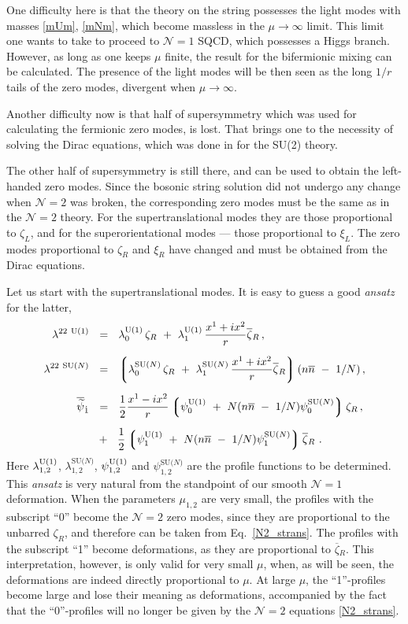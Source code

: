 \documentclass[12pt]{article}
\newcommand{\ntwo}{${\mathcal N}=2$ }
\newcommand{\none}{${\mathcal N}=1$ }
\newcommand{\wt}{\widetilde}
\newcommand{\ov}{\overline}
\newcommand{\lgr}{\left\lgroup}
\newcommand{\rgr}{\right\rgroup}
\newcommand{\bzr}{\ov{\zeta}{}_R}
\newcommand{\nbar}{\ov{n}}
\newcommand{\loU}{\lambda_0^{\rm U(1)}}
\newcommand{\llU}{\lambda_1^{\rm U(1)}}
\newcommand{\loN}{\lambda_0^\text{SU($N$)}}
\newcommand{\llN}{\lambda_1^\text{SU($N$)}}
\newcommand{\poU}{\psi_0^{\rm U(1)}}
\newcommand{\plU}{\psi_1^{\rm U(1)}}
\newcommand{\poN}{\psi_0^\text{SU($N$)}}
\newcommand{\plN}{\psi_1^\text{SU($N$)}}
\begin{document}
	One difficulty here is that the theory on the string possesses the light modes with masses \eqref{mUm}, \eqref{mNm},
	which become massless in the $ \mu \to \infty $ limit.
	This limit one wants to take to proceed to \none SQCD, which possesses a Higgs branch.
	However, as long as one keeps $ \mu $ finite, the result for the bifermionic mixing can be calculated.
	The presence of the light modes will be then seen as the long $ 1/r $ tails of the zero modes,
	divergent when $ \mu \to \infty $.

	Another difficulty now is that half of supersymmetry which was used for calculating the fermionic zero modes, is lost.
	That brings one to the necessity of solving the Dirac equations, which was done in \cite{SYhet} for the SU(2) theory.
	
	The other half of supersymmetry is still there, and can be used to obtain the left-handed zero modes. 
	Since the bosonic string solution did not undergo any change when \ntwo was broken, the corresponding zero modes
	must be the same as in the \ntwo theory.
	For the supertranslational modes they are those proportional to $ \zeta_L $, and for the superorientational
	modes --- those proportional to $ \xi_L $.
	The zero modes proportional to $ \zeta_R $ and $ \xi_R $ have changed and must be obtained from the Dirac equations. 

	Let us start with the supertranslational modes.
	It is easy to guess a good {\it ansatz} for the latter,
\begin{align}
%
\notag
	\lambda^{22\ \rm U(1)} & ~~=~~ \loU\, \zeta_R ~+~ \llU\, \frac{x^1 + i x^2}{r} \ov{\zeta}{}_R \,,
	\\[2mm]
%
\notag
	\lambda^{22\ \text{SU($N$)}} & ~~=~~ \lgr  \loN\, \zeta_R ~+~ \llN\, \frac{x^1 + i x^2}{r} \ov{\zeta}{}_R \rgr
					( n\nbar ~-~ 1/N )\,,
	\\[2mm]
%
\label{ftprofile}
	\ov{\wt{\psi}}{}_{\dot{1}} & ~~=~~ \frac{1}{2} \frac{x^1 - i x^2}{r}
				\lgr  \poU ~+~ N (n\nbar ~-~ 1/N) \poN \rgr \zeta_R 
				\,,\\[2mm]
\notag
				   & 
				~~+~~ \frac{1}{2} \lgr  \plU  ~+~ N (n\nbar ~-~ 1/N) \plN \rgr  \ov{\zeta}{}_R
	~.
\end{align}
	Here $ \lambda^{\rm U(1)}_{1,2} $, $ \lambda^\text{SU($N$)}_{1,2} $, $ \psi^{\rm U(1)}_{1,2} $ and
	$ \psi^\text{SU($N$)}_{1,2} $ are the profile functions to be determined.
	This {\it ansatz} is very natural from the standpoint of our smooth \none deformation. 
	When the parameters $ \mu_{1,2} $ are very small, the profiles with the subscript ``0'' become the \ntwo zero modes,
	since they are proportional to the unbarred $ \zeta_R $, and therefore can be taken from Eq.~\eqref{N2_strans}.
	The profiles with the subscript ``1'' become deformations, as they are proportional to $ \bzr $.
	This interpretation, however, is only valid for very small $ \mu $, when, as  will be seen, the deformations
	are indeed directly proportional to $ \mu $.
	At large $ \mu $, the ``1''-profiles become large and lose their meaning as deformations, accompanied by the fact that 
	the ``0''-profiles will no longer be given by the \ntwo equations \eqref{N2_strans}.
\end{document}
